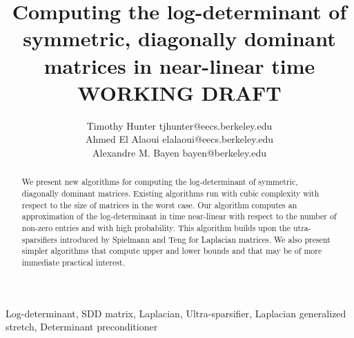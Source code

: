 \documentclass[onefignum,onetabnum]{siamltex}
\title{Computing the log-determinant of symmetric, diagonally dominant matrices
in near-linear time\\
WORKING DRAFT}
\author{Timothy Hunter \email tjhunter@eecs.berkeley.edu \\
Ahmed {El Alaoui} \email elalaoui@eecs.berkeley.edu\\
Alexandre M. Bayen \email bayen@berkeley.edu}
\begin{document}
\maketitle

\begin{abstract}
We present new algorithms for computing the log-determinant of symmetric,
diagonally dominant matrices. Existing algorithms run with cubic complexity
with respect to the size of matrices in the worst case. Our algorithm 
computes an approximation of the log-determinant in time near-linear with 
respect to the number of non-zero entries and with high probability. This 
algorithm builds upon the utra-sparsifiers introduced by Spielmann and Teng for
Laplacian matrices. We also present simpler algorithms that compute upper and 
lower bounds and that may be of more immediate practical interest.
\end{abstract}

\begin{keywords}
Log-determinant,
SDD matrix,
Laplacian,
Ultra-sparsifier,
Laplacian generalized stretch,
Determinant preconditioner
\end{keywords}

\begin{AMS}\end{AMS}


\pagestyle{myheadings}

\thispagestyle{plain}














% 

% 
\end{document}
